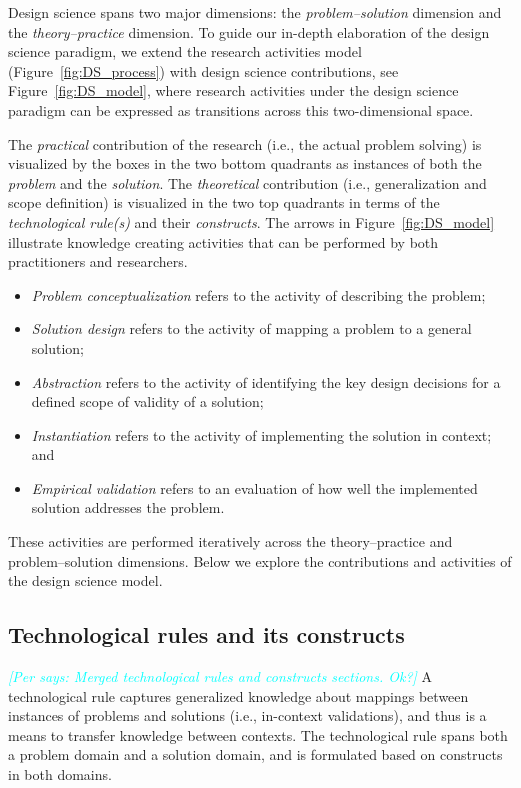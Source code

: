 \documentclass[graybox]{svmult}
\newcommand{\per}[1]{\textcolor{cyan}{{\it [Per says: #1]}}}
\newcommand{\per}[1]{}
\begin{document}
Design science spans two major dimensions: the \emph{problem--solution} dimension and the \emph{theory--practice} dimension. To guide our in-depth elaboration of the design science paradigm, we extend the research activities model (Figure~\ref{fig:DS_process}) with design science contributions, see Figure~\ref{fig:DS_model}, where research activities under the design science paradigm can be expressed as transitions across this two-dimensional space.

The \emph{practical} contribution of the research (i.e., the actual problem solving) is visualized by the boxes in the two bottom quadrants as instances of both the \emph{problem} and the \emph{solution}. The \emph{theoretical} contribution (i.e., generalization and scope definition) is visualized in the two top quadrants in terms of the \emph{technological rule(s)} and their \emph{constructs}. 
The arrows in Figure~\ref{fig:DS_model} illustrate knowledge creating activities that can be performed by both practitioners and researchers. 
\begin{itemize}
\item \emph{Problem conceptualization} refers to the activity of describing the problem; %
\item \emph{Solution design} refers to the activity of mapping a problem to a general solution; 
\item \emph{Abstraction} refers to the activity of identifying the key design decisions for a defined scope of validity of a solution; 
\item \emph{Instantiation} refers to the activity of implementing the solution in context; and 
\item \emph{Empirical validation} refers to an evaluation of how well the implemented solution addresses the problem.
\end{itemize}

These activities are performed iteratively across the theory--practice and problem--solution dimensions. Below we explore the contributions and activities of the design science model. 

\subsection{Technological rules and its constructs}
\label{sec:technologicalrules}

\per{Merged technological rules and constructs sections. Ok?}
A technological rule captures generalized knowledge about mappings between instances of problems and solutions (i.e., in-context validations), and thus is a means to transfer knowledge between contexts. The technological rule spans both a problem domain and a solution domain, and is formulated based on constructs in both domains. 
\end{document}
